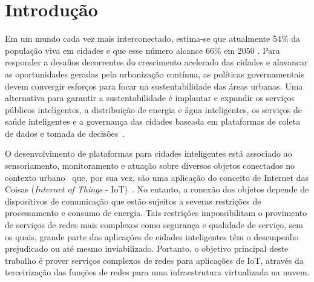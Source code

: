 \documentclass[12pt]{article}
\begin{document}
\section{Introdução}
\label{sec:introducao}
Em um mundo cada vez mais interconectado, estima-se que atualmente 54\% da população viva em cidades e que esse número alcance 66\% em 2050 \cite{relatorio-onu}. 
Para responder a desafios decorrentes do crescimento acelerado das cidades e alavancar as oportunidades geradas pela urbanização contínua, as políticas governamentais devem convergir esforços para focar na sustentabilidade das áreas urbanas. Uma alternativa para garantir a sustentabilidade é implantar e expandir os serviços públicos inteligentes, a distribuição de energia e água inteligentes, os serviços de saúde inteligentes e a governança das cidades baseada em plataformas de coleta de dados e tomada de decisões~\cite{petrolo,interscity-paper}. %

O desenvolvimento de plataformas para cidades inteligentes está associado ao 
sensoriamento, monitoramento e atuação sobre diversos objetos conectados no contexto urbano~\cite{zhang-security} que, por sua vez, são uma aplicação do conceito de Internet das Coisas (\textit{Internet of Things} - IoT)~\cite{petrolo}. 
No entanto, a conexão dos objetos depende de dispositivos de comunicação que estão sujeitos a severas restrições de processamento e consumo de energia. Tais restrições impossibilitam o provimento de serviços de redes mais complexos como segurança e qualidade de serviço, sem os quais, grande parte das aplicações de cidades inteligentes têm o desempenho prejudicado ou até mesmo inviabilizado. Portanto, o objetivo principal deste trabalho é prover serviços complexos de redes 
para aplicações de IoT, %
através da terceirização das funções de redes para uma infraestrutura virtualizada na nuvem.
\end{document}

